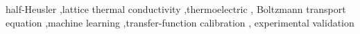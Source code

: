 \begin{keyword}
half-Heusler \sep lattice thermal conductivity \sep thermoelectric \sep
Boltzmann transport equation \sep machine learning \sep transfer-function calibration \sep
experimental validation
\end{keyword}
